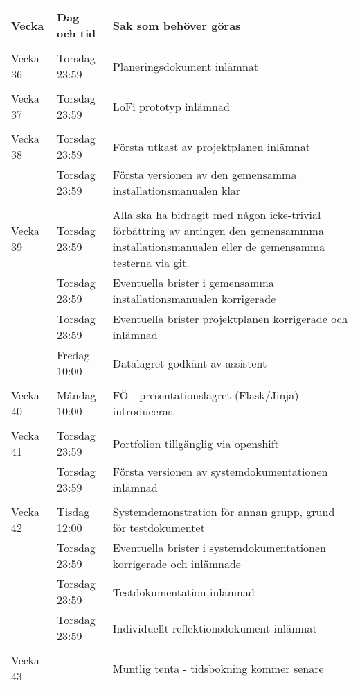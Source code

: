 \documentclass{TDP003mall}
\begin{document}
\begin{table}[!h]
\begin{tabularx}{\linewidth}{|l|l|X|}
\hline

Vecka & Dag och tid & Sak som behöver göras \\\hline 

 & & \\

Vecka 36 & Torsdag 23:59 & Planeringsdokument inlämnat \\
 & & \\

Vecka 37 & Torsdag 23:59 & LoFi prototyp inlämnad \\
 & & \\

Vecka 38 & Torsdag 23:59 & Första utkast av projektplanen inlämnat \\
 & Torsdag 23:59 & Första versionen av den gemensamma installationsmanualen klar \\
 & & \\

Vecka 39 & Torsdag 23:59 & Alla ska ha bidragit med någon icke-trivial förbättring av antingen den gemensammma installationsmanualen eller de gemensamma testerna via git. \\
 & Torsdag 23:59 & Eventuella brister i gemensamma installationsmanualen korrigerade \\
 & Torsdag 23:59 & Eventuella brister projektplanen korrigerade och inlämnad \\
 & Fredag 10:00 & Datalagret godkänt av assistent \\
 & & \\

Vecka 40 & Måndag 10:00 & FÖ - presentationslagret (Flask/Jinja) introduceras. \\
 & & \\

Vecka 41 & Torsdag 23:59 & Portfolion tillgänglig via openshift \\
 & Torsdag 23:59 & Första versionen av systemdokumentationen inlämnad \\
 & & \\

Vecka 42 & Tisdag 12:00 & Systemdemonstration för annan grupp, grund för testdokumentet \\
 & Torsdag 23:59 & Eventuella brister i systemdokumentationen korrigerade och inlämnade \\
 & Torsdag 23:59 & Testdokumentation inlämnad \\
 & Torsdag 23:59 & Individuellt reflektionsdokument inlämnat \\
 & & \\

Vecka 43 & & Muntlig tenta - tidsbokning kommer senare \\

\\

\hline 


\end{tabularx}
\end{table}
\end{document}
